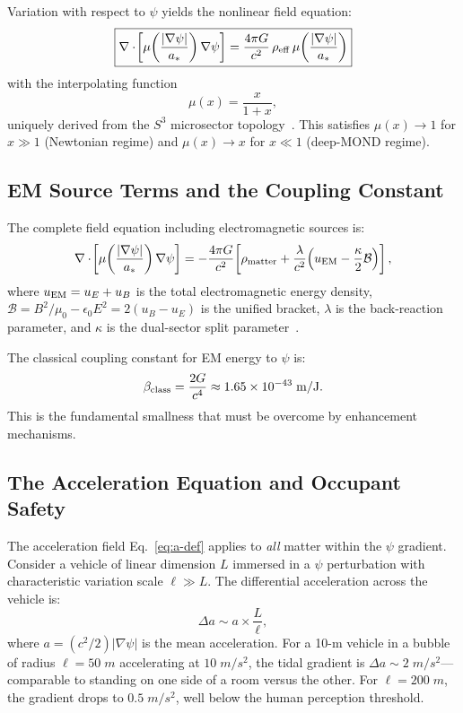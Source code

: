 \documentclass[twocolumn,prl,superscriptaddress,nofootinbib,longbibliography,floatfix]{revtex4-2}
\newcommand{\astar}{a_*}
\newcommand{\lam}{\lambda}
\newcommand{\kap}{\kappa}
\newcommand{\calB}{\mathcal{B}}
\begin{document}
Variation with respect to $\psi$ yields the nonlinear field equation:
\begin{equation}
\boxed{
\nabla\cdot\!\left[\mu\!\left(\frac{|\nabla\psi|}{\astar}\right)
\nabla\psi\right] = \frac{4\pi G}{c^2}\,\rho_{\rm eff}\,
\mu\!\left(\frac{|\nabla\psi|}{\astar}\right)
}
\label{eq:field-equation}
\end{equation}
with the interpolating function
\begin{equation}
\mu(x) = \frac{x}{1+x},
\label{eq:mu-function}
\end{equation}
uniquely derived from the $S^3$ microsector
topology~\cite{Alcock2025DFD}.  This satisfies $\mu(x) \to 1$ for
$x \gg 1$ (Newtonian regime) and $\mu(x) \to x$ for $x \ll 1$
(deep-MOND regime).

\subsection{EM Source Terms and the Coupling Constant}

The complete field equation including electromagnetic sources is:
\begin{equation}
\nabla\cdot\!\left[\mu\!\left(\frac{|\nabla\psi|}{\astar}\right)
\nabla\psi\right] =
-\frac{4\pi G}{c^2}\!\left[
  \rho_{\rm matter}
  + \frac{\lam}{c^2}\!\left(u_{\rm EM} - \frac{\kap}{2}\calB\right)
\right],
\label{eq:master-field}
\end{equation}
where $u_{\rm EM} = u_E + u_B$ is the total electromagnetic energy
density, $\calB = B^2/\mu_0 - \epsilon_0 E^2 = 2(u_B - u_E)$ is the
unified bracket, $\lam$ is the back-reaction parameter, and $\kap$ is
the dual-sector split parameter~\cite{Alcock2025EMcoupling}.

The classical coupling constant for EM energy to $\psi$ is:
\begin{equation}
\beta_{\rm class} = \frac{2G}{c^4} \approx
1.65 \times 10^{-43}\;\si{m/J}.
\label{eq:beta-class}
\end{equation}
This is the fundamental smallness that must be overcome by enhancement
mechanisms.

\subsection{The Acceleration Equation and Occupant Safety}

The acceleration field Eq.~\eqref{eq:a-def} applies to \emph{all}
matter within the $\psi$ gradient.  Consider a vehicle of linear
dimension $L$ immersed in a $\psi$ perturbation with characteristic
variation scale $\ell \gg L$.  The differential acceleration across the
vehicle is:
\begin{equation}
\Delta a \sim a \times \frac{L}{\ell},
\label{eq:tidal}
\end{equation}
where $a = (c^2/2)|\nabla\psi|$ is the mean acceleration.  For a 10-m
vehicle in a bubble of radius $\ell = 50\;\si{m}$ accelerating at
$10\;\si{m/s^2}$, the tidal gradient is
$\Delta a \sim 2\;\si{m/s^2}$---comparable to standing on one side of a
room versus the other.  For $\ell = 200\;\si{m}$, the gradient drops to
$0.5\;\si{m/s^2}$, well below the human perception threshold.
\end{document}
